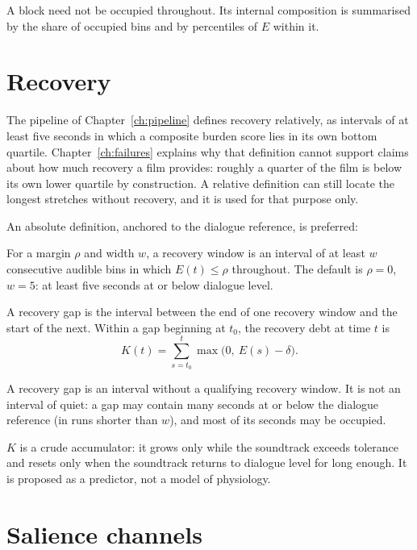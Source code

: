 A block need not be occupied throughout. Its internal composition is summarised by the share of occupied bins and by percentiles of $E$ within it.

\section{Recovery}

The pipeline of Chapter~\ref{ch:pipeline} defines recovery relatively, as intervals of at least five seconds in which a composite burden score lies in its own bottom quartile. Chapter~\ref{ch:failures} explains why that definition cannot support claims about how much recovery a film provides: roughly a quarter of the film is below its own lower quartile by construction. A relative definition can still locate the longest stretches without recovery, and it is used for that purpose only.

An absolute definition, anchored to the dialogue reference, is preferred:

\begin{definition}
For a margin $\rho$ and width $w$, a recovery window is an interval of at least $w$ consecutive audible bins in which $E(t)\le\rho$ throughout. The default is $\rho = 0$, $w=5$: at least five seconds at or below dialogue level.
\end{definition}

\begin{definition}
A recovery gap is the interval between the end of one recovery window and the start of the next. Within a gap beginning at $t_0$, the recovery debt at time $t$ is
\begin{equation}
K(t) = \sum_{s=t_0}^{t} \max\big(0,\ E(s) - \delta\big).
\end{equation}
\end{definition}

A recovery gap is an interval without a qualifying recovery window. It is not an interval of quiet: a gap may contain many seconds at or below the dialogue reference (in runs shorter than $w$), and most of its seconds may be occupied.

$K$ is a crude accumulator: it grows only while the soundtrack exceeds tolerance and resets only when the soundtrack returns to dialogue level for long enough. It is proposed as a predictor, not a model of physiology.

\section{Salience channels}
\label{sec:channels}

